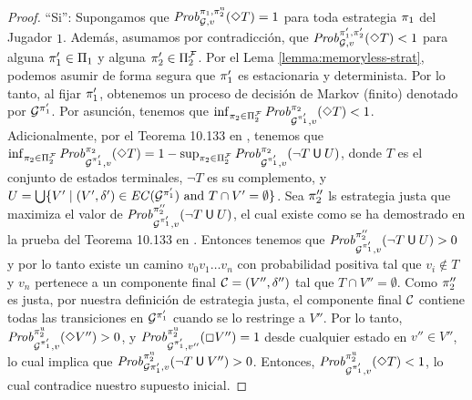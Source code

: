 \begin{proof}
``Si'': Supongamos que $\mathit{Prob}^{\pi_{1}, \pi^{\mathrm{u}}_{2}}_{\mathcal{G},v}(\Diamond T)=1$ para toda estrategia $\pi_{1}$ del Jugador $1$.  Además, 
asumamos por contradicción, que
$\mathit{Prob}^{\pi_{1}', \pi_{2}'}_{\mathcal{G},v}(\Diamond T) < 1$ para alguna $\pi_{1}'\in \Pi_{1}$ y alguna $\pi_{2}'\in \Pi^{\mathcal{F}}_{2}$. 
Por el Lema \ref{lemma:memoryless-strat}, podemos asumir de forma segura que $\pi_{1}'$ es estacionaria y determinista.
Por lo tanto, al fijar $\pi_{1}'$, obtenemos un proceso de decisión de Markov (finito) denotado por $\mathcal{G}^{\pi_{1}'}$.
Por asunción, tenemos que
$\inf_{\pi_{2} \in \Pi^{\mathcal{F}}_{2}} \mathit{Prob}^{\pi_{2}}_{\mathcal{G}^{\pi_{1}'},v}(\Diamond T) < 1 $. Adicionalmente, por el Teorema 10.133 en \cite{BaierK08}, tenemos que $\inf_{ \pi_{2} \in \Pi^{\mathcal{F}}_{2}}\mathit{Prob}^{\pi_{2}}_{\mathcal{G}^{\pi_{1}'},v}(\Diamond T) = 1 - \sup_{\pi_{2} \in \Pi^{\mathcal{F}}_{2}} \mathit{Prob}^{\pi_{2}}_{\mathcal{G}^{\pi_{1}'},v}(\neg T \mathbin{\textsf{U}} U)$, donde $T$ es el conjunto de estados terminales,  $\neg T$ es su complemento, y
$U = \bigcup \{ V' \mid (V', \delta') \in \mathit{EC}(\mathcal{G}^{\pi_{1}'}) \text{ and }  T \cap V' = \emptyset\}$.
Sea $\pi_{2}''$ ls estrategia justa que maximiza el valor de $\mathit{Prob}^{\pi_{2}''}_{\mathcal{G}^{\pi_{1}'},v}(\neg T \mathbin{\textsf{U}} U)$, el cual existe como se ha demostrado en la prueba del Teorema 10.133 en \cite{BaierK08}.
Entonces tenemos que $\mathit{Prob}^{\pi_{2}''}_{\mathcal{G}^{\pi_{1}'},v}(\neg T \mathbin{\textsf{U}} U) > 0$ y por lo tanto existe
un camino $v_0 v_1 \dots v_n$ con probabilidad positiva tal que $v_i \notin T$ y $v_n$ pertenece a un componente final $\mathcal{C} = (V'', \delta'')$
tal que $T \cap V'' = \emptyset$. Como $\pi_{2}''$ es justa, por nuestra definición de estrategia justa, el componente final $\mathcal{C}$ contiene todas las transiciones en $\mathcal{G}^{\pi_{1}'}$ cuando se lo restringe a $V''$.
Por lo tanto, $\mathit{Prob}^{\pi^{\mathrm{u}}_{2}}_{\mathcal{G}^{\pi_{1}'},v}(\Diamond V'') > 0$, y 
$\mathit{Prob}^{\pi^{\mathrm{u}}_{2}}_{\mathcal{G}^{\pi_{1}'},v''}(\Box V'') = 1 $ 
desde cualquier estado en $v'' \in V''$, lo cual implica que $\mathit{Prob}^{\pi^{\mathrm{u}}_{2}}_{\mathcal{G}{\pi_{1}'},v}(\neg T \mathbin{\textsf{U}} V'') > 0$. 
Entonces, $\mathit{Prob}^{\pi^{\mathrm{u}}_{2}}_{\mathcal{G}^{\pi_{1}'},v}(\Diamond T) < 1$, lo cual contradice nuestro supuesto inicial.


\end{proof}
